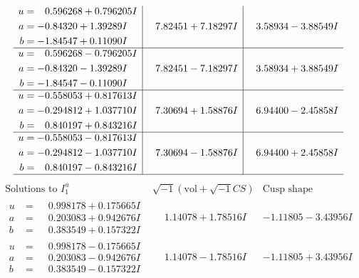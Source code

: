 \documentclass[1p]{elsarticle_modified}
\theoremstyle{definition}
\newcommand{\I}{\sqrt{-1}}
\begin{document}
$$\begin{array}{c|c|c}
\begin{aligned}
u &= \phantom{-}0.596268 + 0.796205 I \\
a &= -0.84320 + 1.39289 I \\
b &= -1.84547 + 0.11090 I\end{aligned}
 & \phantom{-}7.82451 + 7.18297 I & \phantom{-}3.58934 - 3.88549 I \\ \hline\begin{aligned}
u &= \phantom{-}0.596268 - 0.796205 I \\
a &= -0.84320 - 1.39289 I \\
b &= -1.84547 - 0.11090 I\end{aligned}
 & \phantom{-}7.82451 - 7.18297 I & \phantom{-}3.58934 + 3.88549 I \\ \hline\begin{aligned}
u &= -0.558053 + 0.817613 I \\
a &= -0.294812 + 1.037710 I \\
b &= \phantom{-}0.840197 + 0.843216 I\end{aligned}
 & \phantom{-}7.30694 + 1.58876 I & \phantom{-}6.94400 - 2.45858 I \\ \hline\begin{aligned}
u &= -0.558053 - 0.817613 I \\
a &= -0.294812 - 1.037710 I \\
b &= \phantom{-}0.840197 - 0.843216 I\end{aligned}
 & \phantom{-}7.30694 - 1.58876 I & \phantom{-}6.94400 + 2.45858 I\\
 \hline 
 \end{array}$$\newpage$$\begin{array}{c|c|c}  
\text{Solutions to }I^u_{1}& \I (\text{vol} + \sqrt{-1}CS) & \text{Cusp shape}\\
 \hline 
\begin{aligned}
u &= \phantom{-}0.998178 + 0.175665 I \\
a &= \phantom{-}0.203083 + 0.942676 I \\
b &= \phantom{-}0.383549 + 0.157322 I\end{aligned}
 & \phantom{-}1.14078 + 1.78516 I & -1.11805 - 3.43956 I \\ \hline\begin{aligned}
u &= \phantom{-}0.998178 - 0.175665 I \\
a &= \phantom{-}0.203083 - 0.942676 I \\
b &= \phantom{-}0.383549 - 0.157322 I\end{aligned}
 & \phantom{-}1.14078 - 1.78516 I & -1.11805 + 3.43956 I \\ \hline\begin{aligned}

\end{aligned}
\end{array}$$
\end{document}
